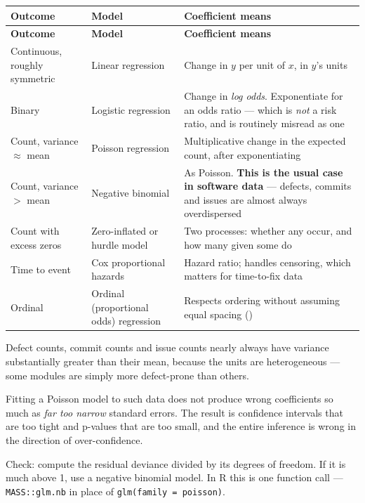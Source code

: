 \begin{center}
\small
\begin{longtable}{@{}L{3.0cm}L{3.6cm}L{7.0cm}@{}}
\toprule
\textbf{Outcome} & \textbf{Model} & \textbf{Coefficient means} \\
\midrule
\endfirsthead
\toprule
\textbf{Outcome} & \textbf{Model} & \textbf{Coefficient means} \\
\midrule
\endhead
\bottomrule
\endfoot
Continuous, roughly symmetric
  & Linear regression
  & Change in $y$ per unit of $x$, in $y$'s units \\
Binary
  & Logistic regression
  & Change in \emph{log odds}. Exponentiate for an odds ratio --- which is
    \emph{not} a risk ratio, and is routinely misread as one \\
Count, variance $\approx$ mean
  & Poisson regression
  & Multiplicative change in the expected count, after exponentiating \\
Count, variance $>$ mean
  & Negative binomial
  & As Poisson. \textbf{This is the usual case in software data} --- defects,
    commits and issues are almost always overdispersed \\
Count with excess zeros
  & Zero-inflated or hurdle model
  & Two processes: whether any occur, and how many given some do \\
Time to event
  & Cox proportional hazards
  & Hazard ratio; handles censoring, which matters for time-to-fix data \\
Ordinal
  & Ordinal (proportional odds) regression
  & Respects ordering without assuming equal spacing
    () \\
\end{longtable}
\end{center}

\begin{pitfall}
Defect counts, commit counts and issue counts nearly always have variance
substantially greater than their mean, because the units are heterogeneous ---
some modules are simply more defect-prone than others.

\medskip
Fitting a Poisson model to such data does not produce wrong coefficients so
much as \emph{far too narrow} standard errors. The result is confidence
intervals that are too tight and p-values that are too small, and the entire
inference is wrong in the direction of over-confidence.

\medskip
Check: compute the residual deviance divided by its degrees of freedom. If it
is much above 1, use a negative binomial model. In R this is one function call
--- \texttt{MASS::glm.nb} in place of \texttt{glm(family = poisson)}.
\end{pitfall}

